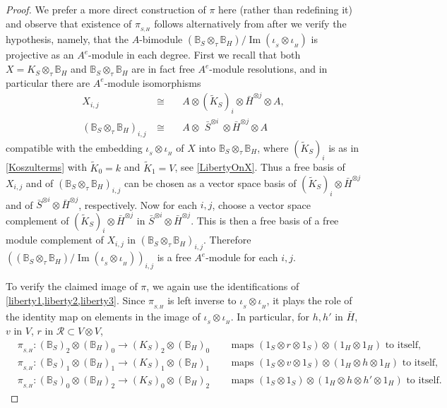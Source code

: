 \documentclass[11pt]{amsart}
\numberwithin{equation}{section}
\DeclareMathOperator{\Ima}{Im}
\newcommand{\R}{\mathcal{R}}
\newcommand{\BB}{\mathbb{B}} %
\renewcommand{\_}[1]{\mbox{$_{\left( #1 \right)}$}}
\newcommand{\ot}{\otimes}
\newcommand{\ott}{\otimes_{\tau}}
\begin{document}
{\begin{proof}
We prefer a more direct construction of $\pi$ here
(rather than redefining it)
and observe that existence of $\pi_{_{S,H}}$ follows
alternatively from
\cite[Lemma 9.1]{TTP-AWEZ}
after we verify the hypothesis, namely, that the $A$-bimodule
$(\BB_S\ot_\tau \BB_H)/\Ima(\iota_{_S}\ot \iota_{_H})$ is projective as 
an $A^e$-module in each degree.
First we recall that both $X=K_S\ot_{\tau} \BB_H$ and $\BB_S\ot_{\tau} \BB_H$
are in fact free $A^e$-module resolutions, and in particular there
are $A^e$-module isomorphisms
\begin{equation}\label{LibertyOnMiddleResolution}
  \begin{aligned}
X_{i,j}  & \ \cong\ && A \ot (\widetilde{K}_S)_i\ot \bar H ^{\ot j} \ot A ,\\
(\BB_S\ot_{\tau}\BB_H)_{i,j} & \ \cong \ &&A \ot \ \, \bar S^{\ot i}\ \ot \bar H^{\ot j}
     \ot A 
   \end{aligned}
   \end{equation}
compatible with the embedding $\iota_{_S}\ot \iota_{_H}$ of $X$ into $\BB_S\ot_{\tau}\BB_H$,
where $(\widetilde{K}_S)_i$ is as in \cref{Koszulterms}
with $\tilde K_0=k$ and $\tilde K_1=V$, 
see \cref{LibertyOnX}.
Thus a free basis of $X_{i,j}$ and of $(\BB_S\ott
\BB_H)_{i,j}$
can be chosen
as a vector space basis of $(\widetilde{K}_S)_i\ot  \bar H ^{\ot j}$ and of 
$\bar S^{\ot i}\ot \bar H^{\ot j}$, respectively.
Now for each $i,j$, choose a vector space complement of 
$(\widetilde{K}_S)_i \ot \bar H^{\ot j}$ in 
$\bar S^{\ot i}\ot \bar H^{\ot j}$.
This is then
 a free basis of a free module complement of $X_{i,j}$ in
$(\BB_S\ot_{\tau}\BB_H)_{i,j}$. 
Therefore $((\BB_S\ot_{\tau} \BB_H)/\Ima(\iota_{_S}\ot \iota_{_H}))_{i,j}$
is a free $A^e$-module for each $i,j$.


To verify the claimed image of $\pi$,
we again use the identifications of \cref{liberty1,liberty2,liberty3}.
Since $\pi_{_{S,H}}$ is left inverse to $\iota_{_S}\ot \iota_{_H}$, 
it plays the role of the identity map 
on elements in the image of $\iota_{_S}\ot \iota_{_H}$. In particular, 
for $h, h'$ in $\bar H$, $v$ in $V$, $r$ in $\R\subset V\ot V$, 
$$
\begin{aligned}
  &\pi_{_{S,H}}:(\BB_S)_2\ot (\BB_H)_0
\rightarrow (K_S)_2\ot (\BB_H)_0
&&\ \text{ maps } (1_S\ot r\ot 1_S)\ot (1_H\ot 1_H)
\text{ to itself,}
\\
&\pi_{_{S,H}}:(\BB_S)_1\ot (\BB_H)_1 
\rightarrow (K_S)_1\ot (\BB_H)_1 
&&\ \text{ maps }
(1_S\ot v\ot 1_S)\ot (1_H\ot h \ot 1_H )
\text{ to itself,}
\\
&\pi_{_{S,H}}:(\BB_S)_0\ot (\BB_H)_2
\rightarrow (K_S)_0\ot (\BB_H)_2
&&\ \text{ maps }
(1_S\ot 1_S)\ot (1_H\ot h\ot h' \ot 1_H )
\text{ to itself}
.
\end{aligned}
$$


\end{proof}}
\end{document}
